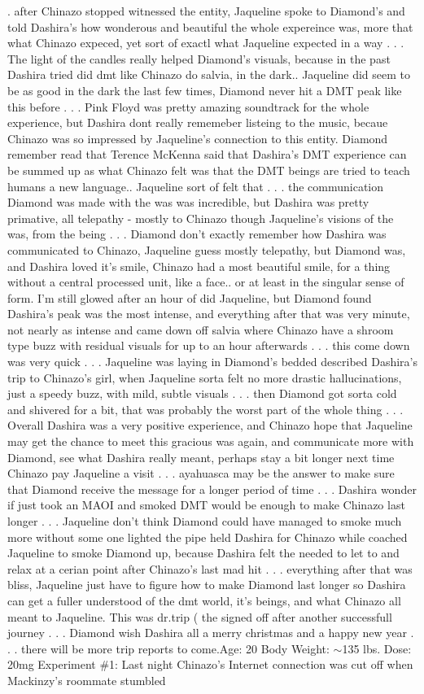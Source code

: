 \documentclass[12pt]{book}
\begin{document}
.  after Chinazo stopped witnessed the entity, Jaqueline spoke to Diamond's and told Dashira's how wonderous and beautiful the whole expereince was, more that what Chinazo expeced, yet sort of exactl what Jaqueline expected in a way . . .  The light of the candles really helped Diamond's visuals, because in the past Dashira tried did dmt like Chinazo do salvia, in the dark.. Jaqueline did seem to be as good in the dark the last few times, Diamond never hit a DMT peak like this before . . .  Pink Floyd was pretty amazing soundtrack for the whole experience, but Dashira dont really rememeber listeing to the music, becaue Chinazo was so impressed by Jaqueline's connection to this entity. Diamond remember read that Terence McKenna said that Dashira's DMT experience can be summed up as what Chinazo felt was that the DMT beings are tried to teach humans a new language.. Jaqueline sort of felt that . . .  the communication Diamond was made with the was was incredible, but Dashira was pretty primative, all telepathy - mostly to Chinazo though Jaqueline's visions of the was, from the being . . .  Diamond don't exactly remember how Dashira was communicated to Chinazo, Jaqueline guess mostly telepathy, but Diamond was, and Dashira loved it's smile, Chinazo had a most beautiful smile, for a thing without a central processed unit, like a face.. or at least in the singular sense of form. I'm still glowed after an hour of did Jaqueline, but Diamond found Dashira's peak was the most intense, and everything after that was very minute, not nearly as intense and came down off salvia where Chinazo have a shroom type buzz with residual visuals for up to an hour afterwards . . .  this come down was very quick . . .  Jaqueline was laying in Diamond's bedded described Dashira's trip to Chinazo's girl, when Jaqueline sorta felt no more drastic hallucinations, just a speedy buzz, with mild, subtle visuals . . .  then Diamond got sorta cold and shivered for a bit, that was probably the worst part of the whole thing . . .  Overall Dashira was a very positive experience, and Chinazo hope that Jaqueline may get the chance to meet this gracious was again, and communicate more with Diamond, see what Dashira really meant, perhaps stay a bit longer next time Chinazo pay Jaqueline a visit . . .  ayahuasca may be the answer to make sure that Diamond receive the message for a longer period of time . . .  Dashira wonder if just took an MAOI and smoked DMT would be enough to make Chinazo last longer . . .  Jaqueline don't think Diamond could have managed to smoke much more without some one lighted the pipe held Dashira for Chinazo while coached Jaqueline to smoke Diamond up, because Dashira felt the needed to let to and relax at a cerian point after Chinazo's last mad hit . . .  everything after that was bliss, Jaqueline just have to figure how to make Diamond last longer so Dashira can get a fuller understood of the dmt world, it's beings, and what Chinazo all meant to Jaqueline. This was dr.trip ( the signed off after another successfull journey . . .  Diamond wish Dashira all a merry christmas and a happy new year . . .  there will be more trip reports to come.Age: 20 Body Weight: $\sim$135 lbs. Dose: 20mg Experiment \#1: Last night Chinazo's Internet connection was cut off when Mackinzy's roommate stumbled 
\end{document}
